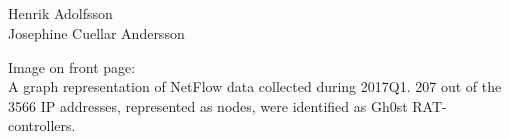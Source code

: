 
\noindent
\thesistitle \\
\thesissubtitle \\
\whatthisis \\
\\
\large{%
    Henrik Adolfsson\\
	Josephine Cuellar Andersson\\
}

\vspace*{\fill}
\noindent
Image on front page:\\
A graph representation of NetFlow data collected during 2017Q1. 207 out of the 3566 IP addresses, represented as nodes, were identified as Gh0st RAT-controllers. 
\thispagestyle{empty}
\newpage

